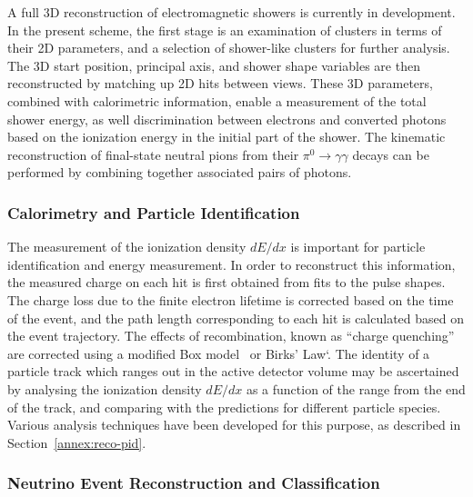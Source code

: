 A full 3D reconstruction of electromagnetic showers is currently in development.
In the present scheme, the first stage is an examination of clusters 
in terms of their 2D parameters, and a selection of shower-like clusters 
for further analysis. The 3D start position, principal axis,
and shower shape variables are then reconstructed by matching up 2D hits between views.
These 3D parameters, combined with calorimetric information, enable a measurement
of the total shower energy, as well discrimination between electrons
and converted photons based on the ionization energy in the initial part of
the shower. The kinematic reconstruction of final-state neutral pions from their
$\pi^{0} \rightarrow \gamma\gamma$ decays can be performed by 
combining together associated pairs of photons.


\subsubsection{Calorimetry and Particle Identification}

The measurement of the ionization density $dE/dx$ is important
for particle identification and energy measurement.
In order to reconstruct this information, the measured charge on each hit 
is first obtained from fits to the pulse shapes.
The charge loss due to the finite electron lifetime is corrected
based on the time of the event, and the path length corresponding
to each hit is calculated based on the event trajectory.
The effects of recombination, known as ``charge quenching''
are corrected using a modified Box model~\cite{Thomas:1987zz} 
or Birks' Law`\cite{Birks:1964zz}.
The identity of a particle track which ranges out in the active detector volume
may be ascertained by analysing the ionization density $dE/dx$ as a function of 
the range from the end of the track, and comparing with the predictions
for different particle species. Various analysis techniques have been developed
for this purpose, as described in Section~\ref{annex:reco-pid}.
 

\subsubsection{Neutrino Event Reconstruction and Classification}

